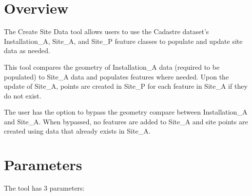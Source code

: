 \documentclass[openany]{book}
\theoremstyle{definition}
\theoremstyle{definition}
\theoremstyle{definition}
\theoremstyle{remark}
\begin{document}
\section{Overview}\label{overview}

The Create Site Data tool allows users to use the Cadastre dataset's
Installation\_A, Site\_A, and Site\_P feature classes to populate and
update site data as needed.

This tool compares the geometry of Installation\_A data (required to be
populated) to Site\_A data and populates features where needed. Upon the
update of Site\_A, points are created in Site\_P for each feature in
Site\_A if they do not exist.

The user has the option to bypass the geometry compare between
Installation\_A and Site\_A. When bypassed, no features are added to
Site\_A and site points are created using data that already exists in
Site\_A.

\section{Parameters}\label{parameters}

The tool has 3 parameters:
\end{document}
